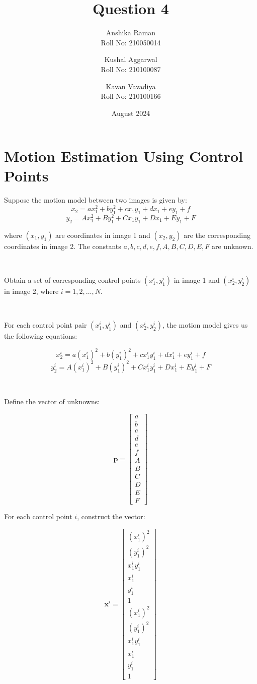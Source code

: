 \documentclass[a4paper,12pt]{article}
\title{Question 4}
\author{Anshika Raman \\ Roll No: 210050014
    \and Kushal Aggarwal \\ Roll No: 210100087
    \and Kavan Vavadiya \\ Roll No: 210100166}
\date{August 2024}
\begin{document}
\maketitle
\section*{Motion Estimation Using Control Points}

Suppose the motion model between two images is given by:
\[
x_2 = a x_1^2 + b y_1^2 + c x_1 y_1 + d x_1 + e y_1 + f
\]
\[
y_2 = A x_1^2 + B y_1^2 + C x_1 y_1 + D x_1 + E y_1 + F
\]

where \( (x_1, y_1) \) are coordinates in image 1 and \( (x_2, y_2) \) are the corresponding coordinates in image 2. The constants \(a, b, c, d, e, f, A, B, C, D, E, F\) are unknown. 

\

Obtain a set of corresponding control points \((x_1^i, y_1^i)\) in image 1 and \((x_2^i, y_2^i)\) in image 2, where \(i = 1, 2, \ldots, N\). 

\

For each control point pair \( (x_1^i, y_1^i) \) and \( (x_2^i, y_2^i) \), the motion model gives us the following equations:

\[
x_2^i = a (x_1^i)^2 + b (y_1^i)^2 + c x_1^i y_1^i + d x_1^i + e y_1^i + f
\]
\[
y_2^i = A (x_1^i)^2 + B (y_1^i)^2 + C x_1^i y_1^i + D x_1^i + E y_1^i + F
\]

\

Define the vector of unknowns:

\[
\mathbf{p} = \begin{bmatrix}
a \\
b \\
c \\
d \\
e \\
f \\
A \\
B \\
C \\
D \\
E \\
F
\end{bmatrix}
\]

For each control point \(i\), construct the vector:

\[
\mathbf{x}^i = \begin{bmatrix}
(x_1^i)^2 \\
(y_1^i)^2 \\
x_1^i y_1^i \\
x_1^i \\
y_1^i \\
1 \\
(x_1^i)^2 \\
(y_1^i)^2 \\
x_1^i y_1^i \\
x_1^i \\
y_1^i \\
1
\end{bmatrix}
\]
\end{document}
